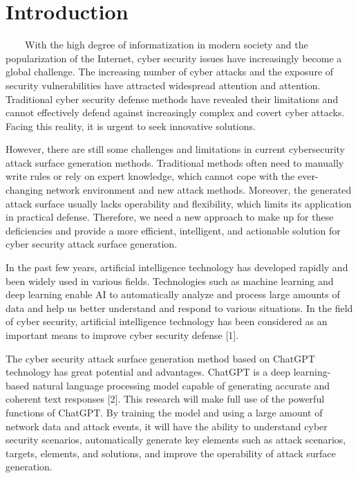 \documentclass[runningheads]{llncs}
\begin{document}
\section{Introduction}
\ \ \ \ With the high degree of informatization in modern society and the popularization of the Internet, cyber security issues have increasingly become a global challenge. The increasing number of cyber attacks and the exposure of security vulnerabilities have attracted widespread attention and attention. Traditional cyber security defense methods have revealed their limitations and cannot effectively defend against increasingly complex and covert cyber attacks. Facing this reality, it is urgent to seek innovative solutions.\par
%
However, there are still some challenges and limitations in current cybersecurity attack surface generation methods. Traditional methods often need to manually write rules or rely on expert knowledge, which cannot cope with the ever-changing network environment and new attack methods. Moreover, the generated attack surface usually lacks operability and flexibility, which limits its application in practical defense. Therefore, we need a new approach to make up for these deficiencies and provide a more efficient, intelligent, and actionable solution for cyber security attack surface generation.\par
%
In the past few years, artificial intelligence technology has developed rapidly and been widely used in various fields. Technologies such as machine learning and deep learning enable AI to automatically analyze and process large amounts of data and help us better understand and respond to various situations. In the field of cyber security, artificial intelligence technology has been considered as an important means to improve cyber security defense [1].\par
%
The cyber security attack surface generation method based on ChatGPT technology has great potential and advantages. ChatGPT is a deep learning-based natural language processing model capable of generating accurate and coherent text responses [2]. This research will make full use of the powerful functions of ChatGPT. By training the model and using a large amount of network data and attack events, it will have the ability to understand cyber security scenarios, automatically generate key elements such as attack scenarios, targets, elements, and solutions, and improve the operability of attack surface generation.\par
\end{document}
